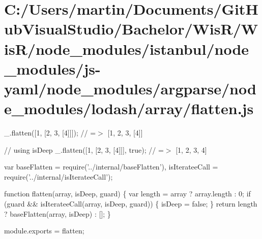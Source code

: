 \hypertarget{_c_1_2_users_2martin_2_documents_2_git_hub_visual_studio_2_bachelor_2_wis_r_2_wis_r_2node_modulebcb679d9a0fbb16904d2931acf37a35a}{}\section{C\+:/\+Users/martin/\+Documents/\+Git\+Hub\+Visual\+Studio/\+Bachelor/\+Wis\+R/\+Wis\+R/node\+\_\+modules/istanbul/node\+\_\+modules/js-\/yaml/node\+\_\+modules/argparse/node\+\_\+modules/lodash/array/flatten.\+js}
\+\_\+.\+flatten(\mbox{[}1, \mbox{[}2, 3, \mbox{[}4\mbox{]}\mbox{]}\mbox{]}); // =$>$ \mbox{[}1, 2, 3, \mbox{[}4\mbox{]}\mbox{]}

// using {\ttfamily is\+Deep} \+\_\+.\+flatten(\mbox{[}1, \mbox{[}2, 3, \mbox{[}4\mbox{]}\mbox{]}\mbox{]}, true); // =$>$ \mbox{[}1, 2, 3, 4\mbox{]}


\begin{DoxyCodeInclude}
var baseFlatten = require(\textcolor{stringliteral}{'../internal/baseFlatten'}),
    isIterateeCall = require(\textcolor{stringliteral}{'../internal/isIterateeCall'});

\textcolor{keyword}{function} flatten(array, isDeep, guard) \{
  var length = array ? array.length : 0;
  \textcolor{keywordflow}{if} (guard && isIterateeCall(array, isDeep, guard)) \{
    isDeep = \textcolor{keyword}{false};
  \}
  \textcolor{keywordflow}{return} length ? baseFlatten(array, isDeep) : [];
\}

module.exports = flatten;
\end{DoxyCodeInclude}
 